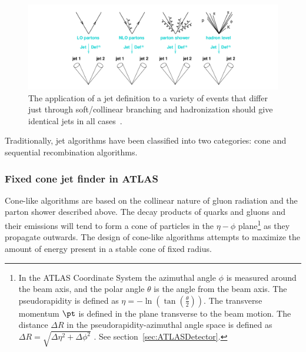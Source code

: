 \begin{figure}[htbp]
  \begin{center}
      \includegraphics[width=1\textwidth]{Fig2/jetdefinition.png}
    \caption{The application of a jet definition to a variety of events that differ just through soft/collinear branching and hadronization should give identical jets in all cases~\cite{GavinLectures}.}
    \label{fig:jetdefinition}
  \end{center}
\end{figure}

Traditionally, jet algorithms have been classified into two categories: cone and sequential recombination algorithms. 

\subsubsection{Fixed cone jet finder in ATLAS}


 Cone-like algorithms are based on the collinear nature of gluon radiation and the parton shower described above. The decay products of quarks and gluons and their emissions will tend to form a cone of particles in the $\eta - \phi$ plane\footnote{In the ATLAS Coordinate System the azimuthal angle $\phi$ is measured around the beam axis, and the polar angle $\theta$ is the angle from the beam axis. The pseudorapidity is defined as $\eta = − \ln( \tan(\frac{\theta}{2}))$. The transverse momentum $\pt$ is defined in the plane transverse to the beam motion. The distance $\Delta R$ in the pseudorapidity-azimuthal angle space is defined as $\Delta R = \sqrt{ \Delta \eta^2  + \Delta \phi^2}$ . See section~\ref{sec:ATLASDetector}.} as they propagate outwards. 
The design of cone-like algorithms attempts to maximize the amount of energy present in a stable cone of fixed radius. 

